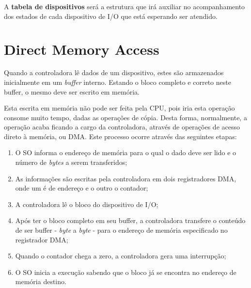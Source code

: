 A \textbf{tabela de dispositivos} será a estrutura que irá auxiliar no acompanhamento dos estados de cada dispositivo de I/O que está esperando ser atendido.






















\section{Direct Memory Access}
Quando a controladora lê dados de um dispositivo, estes são armazenados inicialmente em um \textit{buffer} interno. Estando o bloco completo e correto neste buffer, o mesmo deve ser escrito em memória.

Esta escrita em memória não pode ser feita pela CPU, pois iria esta operação consome muito tempo, dadas as operações de cópia. Desta forma, normalmente, a operação acaba ficando a cargo da controladora, através de operações de acesso direto à memória, ou DMA. Este processo ocorre através das seguintes etapas:

\begin{enumerate}
  \item O SO informa o endereço de memória para o qual o dado deve ser lido e o número de \textit{bytes} a serem transferidos;

  \item As informações são escritas pela controladora em dois registradores DMA, onde um é de endereço e o outro o contador;

  \item A controladora lê o bloco do dispositivo de I/O;

  \item Após ter o bloco completo em seu buffer, a controladora transfere o conteúdo de ser buffer - \textit{byte} a \textit{byte} - para o endereço de memória especificado no registrador DMA;

  \item Quando o contador chega a zero, a controladora gera uma interrupção;

  \item O SO inicia a execução sabendo que o bloco já se encontra no endereço de memória destino.

\end{enumerate}























